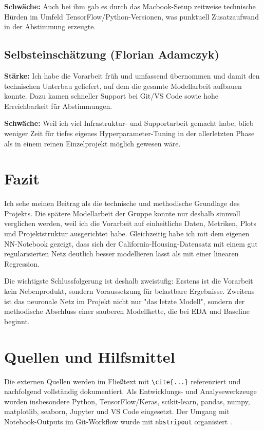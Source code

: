 \documentclass[9pt,a4paper,twocolumn,twoside]{tau-class/tau}
\begin{document}
\textbf{Schw\"ache:} Auch bei ihm gab es durch das Macbook-Setup zeitweise technische H\"urden im Umfeld TensorFlow/Python-Versionen, was punktuell Zusatzaufwand in der Abstimmung erzeugte.

\subsection*{Selbsteinsch\"atzung (Florian Adamczyk)}
\textbf{St\"arke:} Ich habe die Vorarbeit fr\"uh und umfassend \"ubernommen und damit den technischen Unterbau geliefert, auf dem die gesamte Modellarbeit aufbauen konnte. Dazu kamen schneller Support bei Git/VS Code sowie hohe Erreichbarkeit f\"ur Abstimmungen.

\textbf{Schw\"ache:} Weil ich viel Infrastruktur- und Supportarbeit gemacht habe, blieb weniger Zeit f\"ur tiefes eigenes Hyperparameter-Tuning in der allerletzten Phase als in einem reinen Einzelprojekt m\"oglich gewesen w\"are.

\section{Fazit}
Ich sehe meinen Beitrag als die technische und methodische Grundlage des Projekts. Die sp\"atere Modellarbeit der Gruppe konnte nur deshalb sinnvoll verglichen werden, weil ich die Vorarbeit auf einheitliche Daten, Metriken, Plots und Projektstruktur ausgerichtet habe. Gleichzeitig habe ich mit dem eigenen NN-Notebook gezeigt, dass sich der California-Housing-Datensatz mit einem gut regularisierten Netz deutlich besser modellieren l\"asst als mit einer linearen Regression.

Die wichtigste Schlussfolgerung ist deshalb zweistufig: Erstens ist die Vorarbeit kein Nebenprodukt, sondern Voraussetzung f\"ur belastbare Ergebnisse. Zweitens ist das neuronale Netz im Projekt nicht nur "das letzte Modell", sondern der methodische Abschluss einer sauberen Modellkette, die bei EDA und Baseline beginnt.

\section*{Quellen und Hilfsmittel}
Die externen Quellen werden im Flie\ss{}text mit \texttt{\textbackslash cite\{...\}} referenziert und nachfolgend vollst\"andig dokumentiert. Als Entwicklungs- und Analysewerkzeuge wurden insbesondere Python, TensorFlow/Keras, scikit-learn, pandas, numpy, matplotlib, seaborn, Jupyter und VS Code eingesetzt. Der Umgang mit Notebook-Outputs im Git-Workflow wurde mit \texttt{nbstripout} organisiert \cite{nbstripout}.
\end{document}
